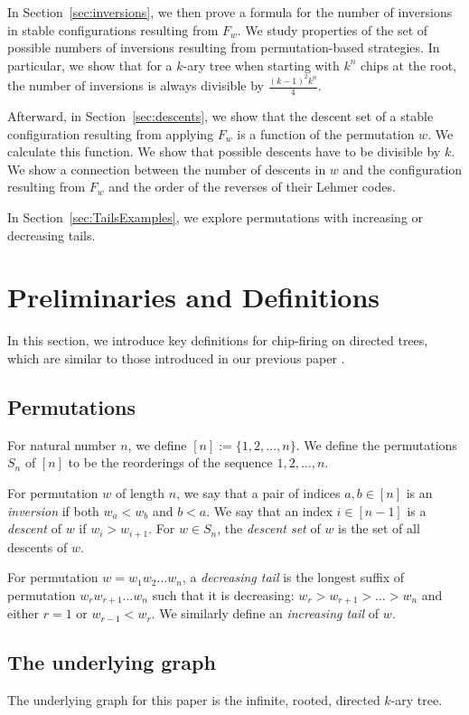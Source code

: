 \documentclass[final]{dmtcs-episciences}
\theoremstyle{definition}
\theoremstyle{remark}
\begin{document}
In Section~\ref{sec:inversions}, we then prove a formula for the number of inversions in stable configurations resulting from $F_w$. We study properties of the set of possible numbers of inversions resulting from permutation-based strategies. In particular, we show that for a $k$-ary tree when starting with $k^n$ chips at the root, the number of inversions is always divisible by $\frac{(k-1)^2k^n}{4}$.

Afterward, in Section~\ref{sec:descents}, we show that the descent set of a stable configuration resulting from applying $F_w$ is a function of the permutation $w$. We calculate this function. We show that possible descents have to be divisible by $k$. We show a connection between the number of descents in $w$ and the configuration resulting from $F_w$ and the order of the reverses of their Lehmer codes.

In Section~\ref{sec:TailsExamples}, we explore permutations with increasing or decreasing tails.


\section{Preliminaries and Definitions}
\label{sec:prelim}
In this section, we introduce key definitions for chip-firing on directed trees, which are similar to those introduced in our previous paper \cite{MR4887467}.
\subsection{Permutations}
For natural number $n$, we define $[n] := \{1, 2, \dots, n\}$. We define the permutations $S_n$ of $[n]$ to be the reorderings of the sequence $1,2, \dots, n$.

For permutation $w$ of length $n$, we say that a pair of indices $a, b \in [n]$ is an \textit{inversion} if both $w_a < w_b$ and $b < a$. We say that an index $i\in [n-1]$ is a \textit{descent} of $w$ if $w_i > w_{i+1}$. For $w \in S_n$, the \textit{descent set} of $w$ is the set of all descents of $w$.

For permutation $w=w_1w_2\dots w_n$, a \textit{decreasing tail} is the longest suffix of permutation $w_rw_{r+1}\dots w_n$ such that it is decreasing: $w_r > w_{r+1} > \dots > w_n$ and either $r=1$ or $w_{r-1} < w_r$. We similarly define an \textit{increasing tail} of $w$.

\subsection{The underlying graph}
\label{sec:definitions}
The underlying graph for this paper is the infinite, rooted, directed $k$-ary tree. 
\end{document}
